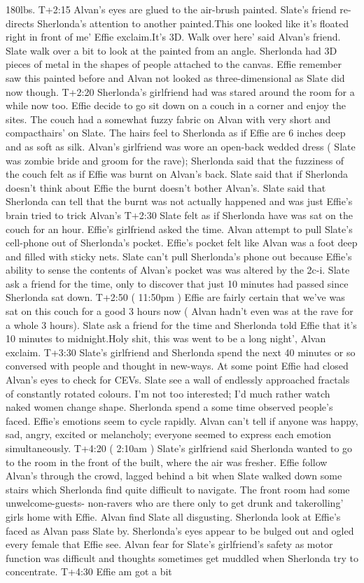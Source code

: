 \documentclass[12pt]{book}
\begin{document}
180lbs. T+2:15 Alvan's eyes are glued to the air-brush painted. Slate's friend re-directs Sherlonda's attention to another painted.This one looked like it's floated right in front of me' Effie exclaim.It's 3D. Walk over here' said Alvan's friend. Slate walk over a bit to look at the painted from an angle. Sherlonda had 3D pieces of metal in the shapes of people attached to the canvas. Effie remember saw this painted before and Alvan not looked as three-dimensional as Slate did now though. T+2:20 Sherlonda's girlfriend had was stared around the room for a while now too. Effie decide to go sit down on a couch in a corner and enjoy the sites. The couch had a somewhat fuzzy fabric on Alvan with very short and compacthairs' on Slate. The hairs feel to Sherlonda as if Effie are 6 inches deep and as soft as silk. Alvan's girlfriend was wore an open-back wedded dress ( Slate was zombie bride and groom for the rave); Sherlonda said that the fuzziness of the couch felt as if Effie was burnt on Alvan's back. Slate said that if Sherlonda doesn't think about Effie the burnt doesn't bother Alvan's. Slate said that Sherlonda can tell that the burnt was not actually happened and was just Effie's brain tried to trick Alvan's T+2:30 Slate felt as if Sherlonda have was sat on the couch for an hour. Effie's girlfriend asked the time. Alvan attempt to pull Slate's cell-phone out of Sherlonda's pocket. Effie's pocket felt like Alvan was a foot deep and filled with sticky nets. Slate can't pull Sherlonda's phone out because Effie's ability to sense the contents of Alvan's pocket was was altered by the 2c-i. Slate ask a friend for the time, only to discover that just 10 minutes had passed since Sherlonda sat down. T+2:50 ( 11:50pm ) Effie are fairly certain that we've was sat on this couch for a good 3 hours now ( Alvan hadn't even was at the rave for a whole 3 hours). Slate ask a friend for the time and Sherlonda told Effie that it's 10 minutes to midnight.Holy shit, this was went to be a long night', Alvan exclaim. T+3:30 Slate's girlfriend and Sherlonda spend the next 40 minutes or so conversed with people and thought in new-ways. At some point Effie had closed Alvan's eyes to check for CEVs. Slate see a wall of endlessly approached fractals of constantly rotated colours. I'm not too interested; I'd much rather watch naked women change shape. Sherlonda spend a some time observed people's faced. Effie's emotions seem to cycle rapidly. Alvan can't tell if anyone was happy, sad, angry, excited or melancholy; everyone seemed to express each emotion simultaneously. T+4:20 ( 2:10am ) Slate's girlfriend said Sherlonda wanted to go to the room in the front of the built, where the air was fresher. Effie follow Alvan's through the crowd, lagged behind a bit when Slate walked down some stairs which Sherlonda find quite difficult to navigate. The front room had some unwelcome-guests- non-ravers who are there only to get drunk and takerolling' girls home with Effie. Alvan find Slate all disgusting. Sherlonda look at Effie's faced as Alvan pass Slate by. Sherlonda's eyes appear to be bulged out and ogled every female that Effie see. Alvan fear for Slate's girlfriend's safety as motor function was difficult and thoughts sometimes get muddled when Sherlonda try to concentrate. T+4:30 Effie am got a bit 
\end{document}
